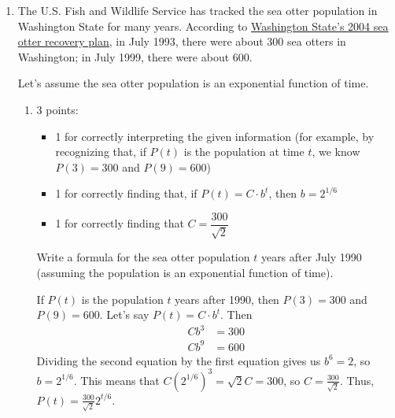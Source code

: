 \documentclass{article}
\makeatletter
\let\@href=\href
\renewcommand{\href}[2]{\@href{#1}{\ul{#2}}}
\makeatother
\begin{document}
\begin{enumerate}
\begin{enumerate}
  \end{enumerate} 

\item  

  The U.S. Fish and Wildlife Service has tracked the sea otter population in Washington State for many years. 
  According to \href{https://wdfw.wa.gov/sites/default/files/publications/00314/wdfw00314.pdf}{Washington State's 2004 sea otter recovery plan}, in July 1993, there were about 300 sea otters in Washington; in July 1999, there were about 600. 

  Let's assume the sea otter population is an exponential function of time. 

  \begin{enumerate}
  \item

    \begin{grading}
      3 points:
      \begin{itemize}[nosep]
      \item 1 for correctly interpreting the given information (for example, by recognizing that, if $P(t)$ is the population at time $t$, we know $P(3) = 300$ and $P(9) = 600$)
      \item 1 for correctly finding that, if $P(t) = C \cdot b^t$, then $b = 2^{1/6}$
      \item 1 for correctly finding that $C = \dfrac{300}{\sqrt{2}}$
      \end{itemize}
    \end{grading}

    \begin{problem}[\stretch{2}]
      Write a formula for the sea otter population $t$ years after July 1990 (assuming the population is an exponential function of time). 
    \end{problem}

    \begin{solution}
      If $P(t)$ is the population $t$ years 
      after 1990, then $P(3)=300$ and $P(9)=600$.
      Let's say $P(t)= C\cdot b^t$. Then
      \begin{align*}
          Cb^{3} &= 300 \\
          Cb^{9} &= 600
      \end{align*}
      Dividing the second equation by the 
      first equation gives us $b^6 = 2$, so
      $b = 2^{1/6}$. This means that 
      $C(2^{1/6})^3 = \sqrt{2}C = 300$, so $C=\frac{300}{\sqrt{2}}$. 
      Thus, $P(t) = \boxed{\frac{300}{\sqrt{2}} 2^{t/6}}$.
    \end{solution}


\end{enumerate}
\end{enumerate}
\end{document}
